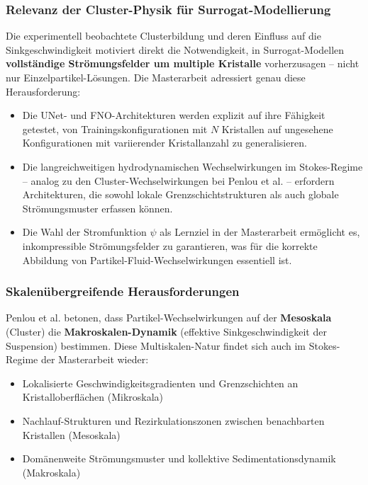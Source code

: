 \documentclass[a4paper,12pt]{article}
\begin{document}
\subsubsection*{Relevanz der Cluster-Physik f\"ur Surrogat-Modellierung}
Die experimentell beobachtete Clusterbildung und deren Einfluss auf die Sinkgeschwindigkeit motiviert direkt die Notwendigkeit, in Surrogat-Modellen \textbf{vollst\"andige Str\"omungsfelder um multiple Kristalle} vorherzusagen -- nicht nur Einzelpartikel-L\"osungen. Die Masterarbeit adressiert genau diese Herausforderung:

\begin{itemize}
    \item Die UNet- und FNO-Architekturen werden explizit auf ihre F\"ahigkeit getestet, von Trainingskonfigurationen mit $N$ Kristallen auf ungesehene Konfigurationen mit variierender Kristallanzahl zu generalisieren.
    \item Die langreichweitigen hydrodynamischen Wechselwirkungen im Stokes-Regime -- analog zu den Cluster-Wechselwirkungen bei Penlou et al. -- erfordern Architekturen, die sowohl lokale Grenzschichtstrukturen als auch globale Str\"omungsmuster erfassen k\"onnen.
    \item Die Wahl der Stromfunktion $\psi$ als Lernziel in der Masterarbeit erm\"oglicht es, inkompressible Str\"omungsfelder zu garantieren, was f\"ur die korrekte Abbildung von Partikel-Fluid-Wechselwirkungen essentiell ist.
\end{itemize}

\subsubsection*{Skalenübergreifende Herausforderungen}
Penlou et al. betonen, dass Partikel-Wechselwirkungen auf der \textbf{Mesoskala} (Cluster) die \textbf{Makroskalen-Dynamik} (effektive Sinkgeschwindigkeit der Suspension) bestimmen. Diese Multiskalen-Natur findet sich auch im Stokes-Regime der Masterarbeit wieder:
\begin{itemize}
    \item Lokalisierte Geschwindigkeitsgradienten und Grenzschichten an Kristalloberfl\"achen (Mikroskala)
    \item Nachlauf-Strukturen und Rezirkulationszonen zwischen benachbarten Kristallen (Mesoskala)
    \item Dom\"anenweite Str\"omungsmuster und kollektive Sedimentationsdynamik (Makroskala)
\end{itemize}
\end{document}
